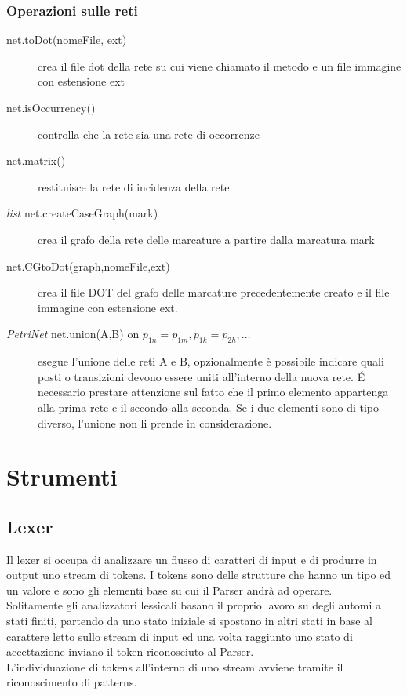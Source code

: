 \documentclass[italian,12pt]{book}
\begin{document}
\subsubsection{Operazioni sulle reti}
\begin{description}
\item[net.toDot(nomeFile, ext)] crea il file
  dot della rete su cui viene chiamato il metodo e un
  file immagine con estensione ext
\item[net.isOccurrency()] controlla che la rete sia
  una rete di occorrenze
\item[net.matrix()] restituisce la rete di incidenza
  della rete
\item[\emph{list} net.createCaseGraph(mark)]
  crea il grafo della rete delle marcature a partire
  dalla marcatura mark
\item[net.CGtoDot(graph,nomeFile,ext)] crea il file
  DOT del grafo delle marcature precedentemente creato
  e il file immagine con estensione ext.
\item[\emph{PetriNet} net.union(A,B) on
  $ p_{1n}=p_{1m}, p_{1k}=p_{2h}, \dots $]  esegue l'unione delle reti A e
  B, opzionalmente è possibile indicare quali posti
  o transizioni devono essere uniti all'interno della
  nuova rete. É necessario prestare attenzione sul
  fatto che il primo elemento appartenga alla prima
  rete e il secondo alla seconda. Se i due elementi
  sono di tipo diverso, l'unione non li
  prende in considerazione.
\end{description}
%       
\section{Strumenti}
\subsection{Lexer}
Il lexer si occupa di analizzare un flusso di caratteri di input e di 
produrre in output uno stream di tokens. I tokens sono delle strutture che hanno 
un tipo ed un valore e sono gli elementi base su cui il Parser andrà 
ad operare.\\
Solitamente gli analizzatori lessicali basano il proprio lavoro su degli 
automi a stati finiti, partendo da uno stato iniziale si spostano in altri stati 
in base al carattere letto sullo stream di input ed una volta raggiunto uno stato di 
accettazione inviano il token riconosciuto al Parser.\\
L'individuazione di tokens all'interno di uno stream avviene tramite il riconoscimento di patterns.
\end{document}
